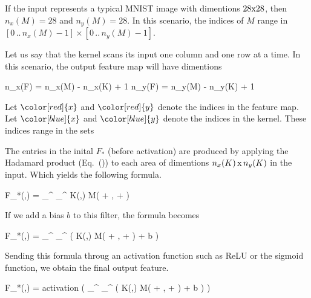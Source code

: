 If the input represents a typical MNIST image with dimentions $28{\rm x}28$, then $n_x(M) = 28$ and $n_y(M) = 28$.
In this scenario, the indices of $M$ range in $[0 \, .. \, n_x(M) - 1] \times [0 \, .. \, n_y(M) - 1]$.

Let us say that the kernel scans its input one column and one row at a time.
In this scenario, the output feature map will have dimentions

\startplaceformula[reference=dimen-feature-1]
\startformula
\startmathalignment[n=1]
\NC n_x(F) = n_x(M) - n_x(K) + 1 \NR
\NC n_y(F) = n_y(M) - n_y(K) + 1 \NR
\stopmathalignment
\stopformula
\stopplaceformula

Let $\color[red]{x}$ and $\color[red]{y}$ denote the indices in the feature map.
Let $\color[blue]{x}$ and $\color[blue]{y}$ denote the indices in the kernel.
These indices range in the sets

\startplaceformula
\startformula
\startmathalignment[n=2]
\NC \color[red]{x} \in [0 \, .. \, n_x(F) - 1] \qquad \NC \color[red]{y} \in [0 \, .. \, n_y(F) - 1] \NR
\NC \color[blue]{x} \in [0 \, .. \, n_x(K) - 1] \qquad \NC \color[blue]{y} \in [0 \, .. \, n_y(K) - 1] \NR
\stopmathalignment
\stopformula
\stopplaceformula

\indentation
The entries in the inital $F_*$ (before activation) are produced by applying the Hadamard product (Eq.~(\in[hdprod])) to each area of dimentions $n_x(K)\,{\rm x}\,n_y(K)$ in the input.
Which yields the following formula.

\startplaceformula[reference=devel-feature-1]
\startformula
F_*(\color[red]{x},\color[red]{y})
= 
\sum_{\color[blue]{y}}^{} 
\sum_{\color[blue]{x}}^{} 
K(\color[blue]{x},\color[blue]{y})
\cdot
M(\color[red]{x} + \color[blue]{x}, \color[red]{y} + \color[blue]{y})
\stopformula
\stopplaceformula

If we add a bias $b$ to this filter, the formula becomes

\startplaceformula[reference=devel-feature-2]
\startformula
F_*(\color[red]{x},\color[red]{y})
= 
\sum_{\color[blue]{y}}^{} 
\sum_{\color[blue]{x}}^{} 
\Bigl(
K(\color[blue]{x},\color[blue]{y})
\cdot
M(\color[red]{x} + \color[blue]{x}, \color[red]{y} + \color[blue]{y})
+
b
\Bigr)
\stopformula
\stopplaceformula

Sending this formula throug an activation function such as ReLU or the sigmoid function, we obtain the final output feature.

\startplaceformula[reference=devel-feature-3]
\startformula
F_*(\color[red]{x},\color[red]{y})
= 
{\rm activation}
\left(
\sum_{\color[blue]{y}}^{} 
\sum_{\color[blue]{x}}^{} 
\Bigl(
K(\color[blue]{x},\color[blue]{y})
\cdot
M(\color[red]{x} + \color[blue]{x}, \color[red]{y} + \color[blue]{y})
+
b
\Bigr)
\right)
\stopformula
\stopplaceformula

